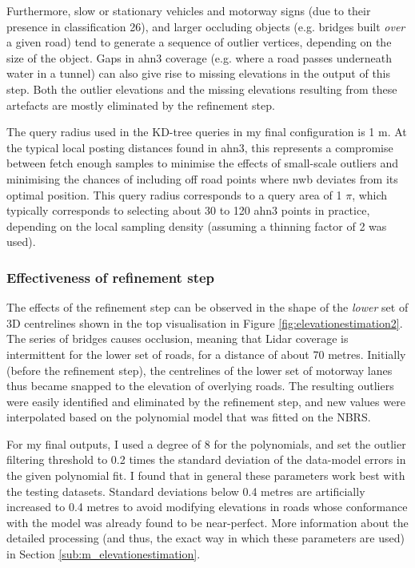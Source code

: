 Furthermore, slow or stationary vehicles and motorway signs (due to their presence in classification 26), and larger occluding objects (e.g. bridges built \textit{over} a given road) tend to generate a sequence of outlier vertices, depending on the size of the object. Gaps in \ac{ahn3} coverage (e.g. where a road passes underneath water in a tunnel) can also give rise to missing elevations in the output of this step. Both the outlier elevations and the missing elevations resulting from these artefacts are mostly eliminated by the refinement step.

The query radius used in the KD-tree queries in my final configuration is 1 m. At the typical local posting distances found in \ac{ahn3}, this represents a compromise between fetch enough samples to minimise the effects of small-scale outliers and minimising the chances of including off road points where \ac{nwb} deviates from its optimal position. This query radius corresponds to a query area of 1 $\pi$, which typically corresponds to selecting about 30 to 120 \ac{ahn3} points in practice, depending on the local sampling density (assuming a thinning factor of 2 was used).

\subsubsection{Effectiveness of refinement step}

The effects of the refinement step can be observed in the shape of the \textit{lower} set of 3D centrelines shown in the top visualisation in Figure \ref{fig:elevationestimation2}. The series of bridges causes occlusion, meaning that Lidar coverage is intermittent for the lower set of roads, for a distance of about 70 metres. Initially (before the refinement step), the centrelines of the lower set of motorway lanes thus became snapped to the elevation of overlying roads. The resulting outliers were easily identified and eliminated by the refinement step, and new values were interpolated based on the polynomial model that was fitted on the NBRS.

For my final outputs, I used a degree of 8 for the polynomials, and set the outlier filtering threshold to 0.2 times the standard deviation of the data-model errors in the given polynomial fit. I found that in general these parameters work best with the testing datasets. Standard deviations below 0.4 metres are artificially increased to 0.4 metres to avoid modifying elevations in roads whose conformance with the model was already found to be near-perfect. More information about the detailed processing (and thus, the exact way in which these parameters are used) in Section \ref{sub:m_elevationestimation}.

